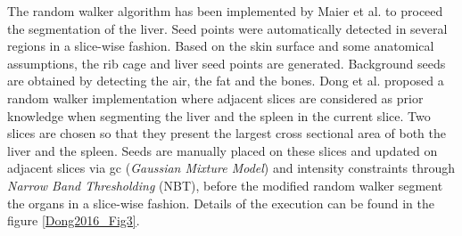 


The random walker algorithm has been implemented by Maier et al. \cite{Maier2008} to proceed the segmentation of the liver. Seed points were
automatically detected in several regions in a slice-wise fashion. Based
on the skin surface and some anatomical assumptions, the rib cage and
liver seed points are generated. Background seeds are obtained by
detecting the air, the fat and the bones.
Dong et al. \cite{Dong2016} proposed a random walker implementation where adjacent slices are
considered as prior knowledge when segmenting the liver and the spleen in the current slice. Two
slices are chosen so that they present the largest cross sectional area
of both the liver and the spleen. Seeds are manually placed on these
slices and updated on adjacent slices via \ac{gc} (\emph{Gaussian Mixture
	Model}) and intensity constraints through \emph{Narrow Band
	Thresholding} (NBT), before the modified random walker segment the organs in a
slice-wise fashion. Details of the execution can be found in the figure
\ref{Dong2016_Fig3}.


